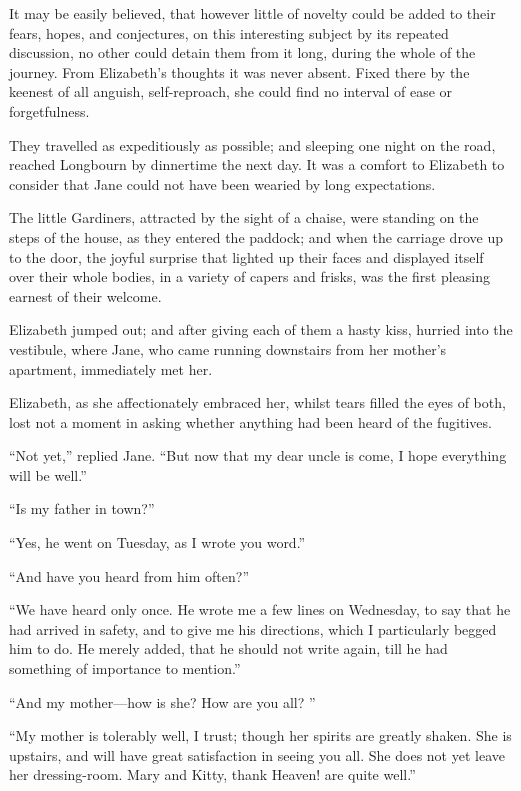 \documentclass[10pt]{book}
\begin{document}
   It may be easily believed, that however little of novelty could be added
to their fears, hopes, and conjectures, on this interesting subject by
its repeated discussion, no other could detain them from it long, during
the whole of the journey. From Elizabeth’s thoughts it was never absent.
Fixed there by the keenest of all anguish,
   self-reproach, she could
find no interval of ease or forgetfulness.
  

   They travelled as expeditiously as possible; and sleeping one night on
the road, reached Longbourn by dinnertime the next day. It was a comfort
to Elizabeth to consider that Jane could not have been wearied by long
expectations.
  

   The little Gardiners, attracted by the sight of a chaise, were standing
on the steps of the house, as they entered the paddock; and when the
carriage drove up to the door, the joyful surprise that lighted up their
faces and displayed itself over their whole bodies, in a variety of
capers and frisks, was the first pleasing earnest of their welcome.
  

   Elizabeth jumped out; and after giving each of them a hasty kiss,
hurried into the vestibule, where Jane, who came running downstairs from
her mother’s apartment, immediately met her.
  

   Elizabeth, as she affectionately embraced her, whilst tears filled the
eyes of both, lost not a moment in asking whether anything had been
heard of the fugitives.
  

   “Not yet,” replied Jane. “But now that my dear uncle is come, I hope
everything will be well.”
  

   “Is my father in town?”
  

   “Yes, he went on Tuesday, as I wrote you word.”
  

   “And have you heard from him often?”
  

   “We have heard only once. He wrote me a few lines on Wednesday, to say
that he had arrived in safety, and to give me his directions, which I
particularly begged him to do. He merely added, that he should not write
again, till he had something of importance to mention.”
  

   “And my mother—how is she? How are you all?
   ”
  

   “My mother is tolerably well, I trust; though her spirits are greatly
shaken. She is upstairs, and will have great satisfaction in seeing you
all. She does not yet leave her dressing-room. Mary and Kitty, thank
Heaven! are quite well.”
  
\end{document}
